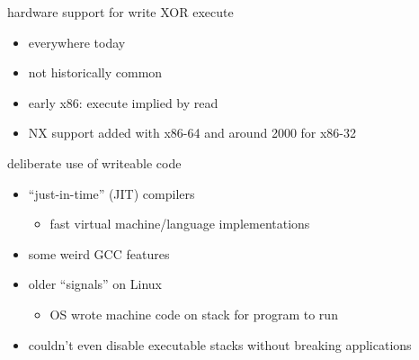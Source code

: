 
\begin{frame}{hardware support for write XOR execute}
    \begin{itemize}
    \item everywhere today
    \item not historically common
    \item early x86: execute implied by read
    \item NX support added with x86-64 and around 2000 for x86-32
    \end{itemize}
\end{frame}

\begin{frame}{deliberate use of writeable code}
    \begin{itemize}
    \item ``just-in-time'' (JIT) compilers
        \begin{itemize}
        \item fast virtual machine/language implementations
        \end{itemize}
    \item some weird GCC features
    \item older ``signals'' on Linux
        \begin{itemize}
        \item OS wrote machine code on stack for program to run
        \end{itemize}
    \item couldn't even disable executable stacks without breaking applications
    \end{itemize}
\end{frame}

